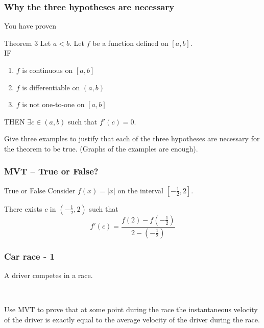 \documentclass[14pt]{beamer}
\newcommand {\DS} [1] {${\displaystyle #1}$}
\newcommand{\setsize}[1]{\fontsize{#1}{#1}\selectfont} %
\newcommand{\smallerfont}{\setsize{13}} %
\begin{document}
\begin{frame}
\frametitle{Why the three hypotheses are necessary}

You have proven

\begin{block}{Theorem 3}
Let $a<b$.  Let $f$ be a function defined on $[a,b]$. \\
IF
	\begin{enumerate}
		\item $f$ is continuous on $[a,b]$
		\item $f$ is differentiable on $(a,b)$
		\item  $f$ is not one-to-one on $[a,b]$
	\end{enumerate}
THEN 
		  \DS{\exists c \in (a,b)} such that $f'(c)=0$.
\end{block}


\vfill

Give three examples to justify that each of the three hypotheses are necessary for the theorem to be true.
(Graphs of the examples are enough).


\end{frame}
\begin{frame}[t]
\frametitle{MVT -- True or False?}

\begin{block}{True or False}
Consider  $f(x) = |x|$ on the interval
 $[-\frac{1}{2}, 2]$.  
 
 There exists $c$ in $(-\frac{1}{2},2)$ such that
\[f'(c) = \frac{f(2) - f(-\frac{1}{2})}{2-(-\frac{1}{2})}\]
\end{block}

\end{frame}

\begin{frame}[t]
\smallerfont
\frametitle{Car race - 1}

A driver competes in a race.

\

Use MVT to prove that at some point during the race the instantaneous velocity of the driver is exactly equal to the average velocity of the driver during the race.


\end{frame}
\end{document}
